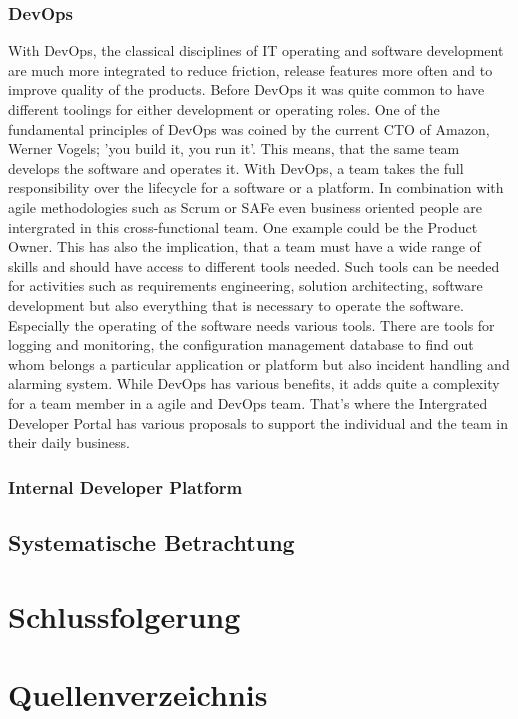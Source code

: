 \documentclass[a4paper,12pt]{article}
\begin{document}
    \subsubsection{DevOps}
    With DevOps, the classical disciplines of IT operating and software development are much more integrated to reduce
    friction, release features more often and to improve quality of the products\cite{safedevops}.
    Before DevOps it was quite common to have different toolings for either development or operating roles.
    One of the fundamental principles of DevOps was coined by the current CTO of Amazon, Werner Vogels\cite{vogels};
    'you build it, you run it'.
    This means, that the same team develops the software and operates it.
    With DevOps, a team takes the full responsibility over the lifecycle for a software or a platform.
    In combination with agile methodologies such as Scrum or SAFe even business oriented people are intergrated in this
    cross-functional team.
    One example could be the Product Owner\cite{safepo}.
    This has also the implication, that a team must have a wide range of skills and should have access to different
    tools needed.
    Such tools can be needed for activities such as requirements engineering, solution architecting, software development
    but also everything that is necessary to operate the software.
    Especially the operating of the software needs various tools. There are tools for logging and monitoring, the
    configuration management database to find out whom belongs a particular application or platform but also incident
    handling and alarming system.
    While DevOps has various benefits, it adds quite a complexity for a team member in a agile and DevOps team.
    That's where the Intergrated Developer Portal has various proposals to support the individual and the team in their
    daily business.

    \subsubsection{Internal Developer Platform}


    \subsection{Systematische Betrachtung}


    \section{Schlussfolgerung}


    \section{Quellenverzeichnis}

    \printbibliography[heading=none]
\end{document}
